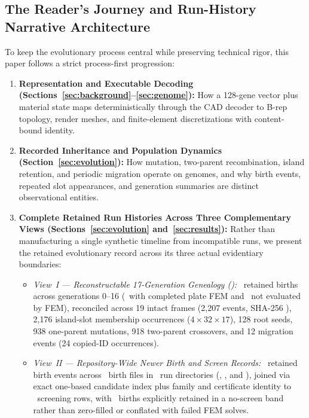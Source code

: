 \subsection{The Reader's Journey and Run-History Narrative Architecture}
\label{subsec:reader-journey}
To keep the evolutionary process central while preserving technical rigor, this paper follows a strict process-first progression:
\begin{enumerate}
  \item \textbf{Representation and Executable Decoding (Sections~\ref{sec:background}--\ref{sec:genome}):} How a 128-gene vector plus material state maps deterministically through the CAD decoder to B-rep topology, render meshes, and finite-element discretizations with content-bound identity.
  \item \textbf{Recorded Inheritance and Population Dynamics (Section~\ref{sec:evolution}):} How mutation, two-parent recombination, island retention, and periodic migration operate on genomes, and why birth events, repeated slot appearances, and generation summaries are distinct observational entities.
  \item \textbf{Complete Retained Run Histories Across Three Complementary Views (Sections~\ref{sec:evolution} and~\ref{sec:results}):} Rather than manufacturing a single synthetic timeline from incompatible runs, we present the retained evolutionary record across its three actual evidentiary boundaries:
  \begin{itemize}
    \item \emph{View~I --- Reconstructable 17-Generation Genealogy ():} \BirthCount\ retained births across generations 0--16 (\FemComplete\ with completed plate FEM and \FemNotEvaluated\ not evaluated by FEM), reconciled across 19 intact  frames (2,207 events, SHA-256 ), 2,176 island-slot membership occurrences ($4\times 32\times 17$), 128 root seeds, 938 one-parent mutations, 918 two-parent crossovers, and 12 migration events (24 copied-ID occurrences).
    \item \emph{View~II --- Repository-Wide Newer Birth and Screen Records:} \NewerBirthEventsCount\ retained birth events across \NewerBirthFilesCount\ birth files in \NewerRunDirsCount\ run directories (, , and ), joined via exact one-based candidate index plus family and certificate identity to \NewerScreenRowsCount\ screening rows, with \NewerUnscreenedBirthsCount\ births explicitly retained in a no-screen band rather than zero-filled or conflated with failed FEM solves.

\end{itemize}
\end{enumerate}
